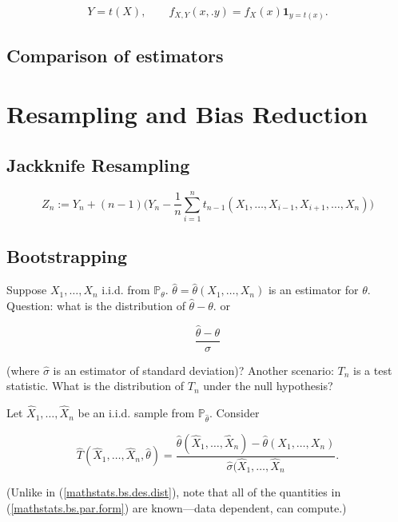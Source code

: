 \begin{remark}

\[
Y = t(X), \qquad f_{X,Y}(x,.y) = f_X(x) \boldsymbol{1}_{y=t(x)}.
\]

\end{remark}

\subsection{Comparison of estimators}

\section{Resampling and Bias Reduction}

\subsection{Jackknife Resampling}

\[
Z_n :=  Y_n + (n-1) \bigg(Y_n - \frac{1}{n} \sum_{i=1}^n t_{n-1}(X_1, \ldots, X_{i-1}, X_{i+1}, \ldots, X_n) \bigg) 
\]

\subsection{Bootstrapping}

Suppose \(X_1, \ldots, X_n\) i.i.d. from \(\mathbb{P}_\theta\). \(\hat{\theta} = \hat{\theta}(X_1, \ldots, X_n)\) is an estimator for \(\theta\). Question: what is the distribution of \(\hat{\theta} - \theta\). or 

\begin{equation}\label{mathstats.bs.des.dist}
\frac{\hat{\theta} - \theta}{\hat{\sigma}}
\end{equation}

 (where \(\hat{\sigma}\) is an estimator of standard deviation)? Another scenario: \(T_n\) is a test statistic. What is the distribution of \(T_n\) under the null hypothesis?

\begin{definition}

Let \(\hat{X}_1, \ldots, \hat{X}_n\) be an i.i.d. sample from \(\mathbb{P}_{\hat{\theta}}\). Consider 

\begin{equation}\label{mathstats.bs.par.form}
\hat{T}(\hat{X}_1, \ldots, \hat{X}_n, \hat{\theta}) = \frac{\hat{\theta}(\hat{X}_1, \ldots, \hat{X}_n) - \hat{\theta}(X_1, \ldots, X_n)}{\hat{\sigma}(\hat{X}_1, \ldots, \hat{X}_n}.
\end{equation}

(Unlike in (\ref{mathstats.bs.des.dist}), note that all of the quantities in (\ref{mathstats.bs.par.form}) are known---data dependent, can compute.)

\end{definition}


